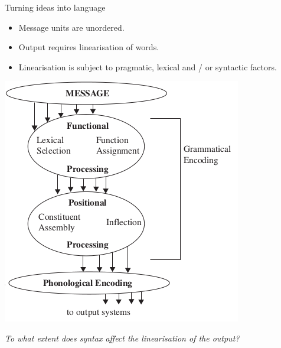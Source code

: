 \begin{frame}{Turning ideas into language \parencite{bock1994}}

\begin{minipage}[t]{.45\textwidth}
\begin{small}
\begin{itemize}
	\item Message units are unordered.
	\item Output requires linearisation of words. %
	\item Linearisation is subject to pragmatic, lexical and / or syntactic factors. 
\end{itemize}
\end{small}
\end{minipage}

\begin{backgroundblock}{60mm}{20mm}	
	\includegraphics[scale=.45]{gfx/BLmodel.png}
\end{backgroundblock}

\end{frame}

\begin{frame}
	\begin{Large}
		\begin{center}
			\textit{To what extent does syntax affect the linearisation of the output?}
		\end{center}
	\end{Large}
\end{frame}


